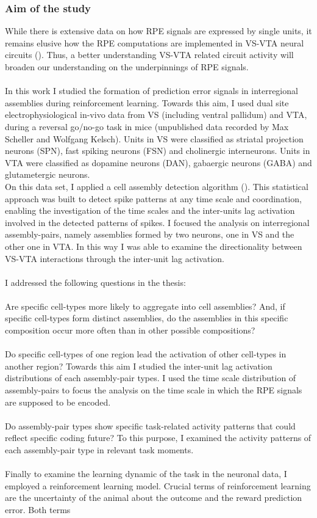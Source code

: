 \subsubsection{Aim of the study}
While there is extensive data on how RPE signals are expressed by single units, it remains elusive how the RPE computations are implemented in VS-VTA neural circuits (\cite{Schultz2016}). Thus, a better understanding VS-VTA related circuit activity will broaden our understanding on the underpinnings of RPE signals.\\\\In this work I studied the formation of prediction error signals in interregional assemblies during reinforcement learning. Towards this aim, I used dual site electrophysiological in-vivo data from VS (including ventral pallidum) and VTA, during a reversal go/no-go task in mice (unpublished data recorded by Max Scheller and Wolfgang Kelsch). Units in VS were classified as striatal projection neurons (SPN), fast spiking neurons (FSN) and cholinergic interneurons. Units in VTA were classified as dopamine neurons (DAN), gabaergic neurons (GABA) and glutametergic neurons.\\On this data set, I applied a cell assembly detection algorithm (\cite{RussoDurstewitz}). This statistical approach was built to detect spike patterns at any time scale and coordination, enabling the investigation of the time scales and the inter-units lag activation involved in the detected patterns of spikes. I focused the analysis on interregional assembly-pairs, namely assemblies formed by two neurons, one in VS and the other one in VTA. In this way I was able to examine the directionality between VS-VTA interactions through the inter-unit lag activation.\\\\I addressed the following questions in the thesis:\\\\Are specific cell-types more likely to aggregate into cell assemblies? And, if specific cell-types form distinct assemblies, do the assemblies in this specific composition occur more often than in other possible compositions?\\\\Do specific cell-types of one region lead the activation of other cell-types in another region? Towards this aim I studied the inter-unit lag activation distributions of each assembly-pair types. I used the time scale distribution of assembly-pairs to focus the analysis on the time scale in which the RPE signals are supposed to be encoded.\\\\Do assembly-pair types show specific task-related activity patterns that could reflect specific coding future? To this purpose, I examined the activity patterns of each assembly-pair type in relevant task moments.\\\\Finally to examine the learning dynamic of the task in the neuronal data, I employed a reinforcement learning model. Crucial terms of reinforcement learning are the uncertainty of the animal about the outcome and the reward prediction error. Both terms 